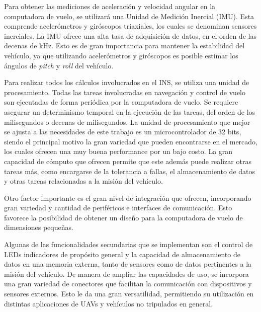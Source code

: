 
Para obtener las mediciones de aceleración y velocidad angular en la computadora de vuelo, se utilizará una Unidad de Medición Inercial (IMU). Esta comprende acelerómetros y giróscopos triaxiales, los cuales se denominan sensores inerciales. La IMU ofrece una alta tasa de adquisición de datos, en el orden de las decenas de kHz. Esto es de gran importancia para mantener la estabilidad del vehículo, ya que utilizando acelerómetros y giróscopos es posible estimar los ángulos de \textit{pitch} y \textit{roll} del vehículo. 


%

Para realizar todos los cálculos involucrados en el INS, se utiliza una unidad de procesamiento. Todas las tareas involucradas en navegación y control de vuelo son ejecutadas de forma periódica por la computadora de vuelo. Se requiere asegurar un determinismo temporal en la ejecución de las tareas, del orden de los milisegundos o decenas de milisegundos. La unidad de procesamiento que mejor se ajusta a las necesidades de este trabajo es un microcontrolador de 32 bits, siendo el principal motivo la gran variedad que pueden encontrarse en el mercado, los cuales ofrecen una muy buena performance por un bajo costo. La gran capacidad de cómputo que ofrecen permite que este además puede realizar otras tareas más, como encargarse de la tolerancia a fallas, el almacenamiento de datos y otras tareas relacionadas a la misión del vehículo.

Otro factor importante es el gran nivel de integración que ofrecen, incorporando gran variedad y cantidad de periféricos e interfaces de comunicación. Esto favorece la posibilidad de obtener un diseño para la computadora de vuelo de dimensiones pequeñas.

Algunas de las funcionalidades secundarias que se implementan son el control de LEDs indicadores de propósito general y la capacidad de almacenamiento de datos en una memoria externa, tanto de sensores como de datos pertinentes a la misión del vehículo. De manera de ampliar las capacidades de uso, se incorpora una gran variedad de conectores que facilitan la comunicación con dispositivos y sensores externos. Esto le da una gran versatilidad, permitiendo su utilización en distintas aplicaciones de UAVs y vehículos no tripulados en general.

